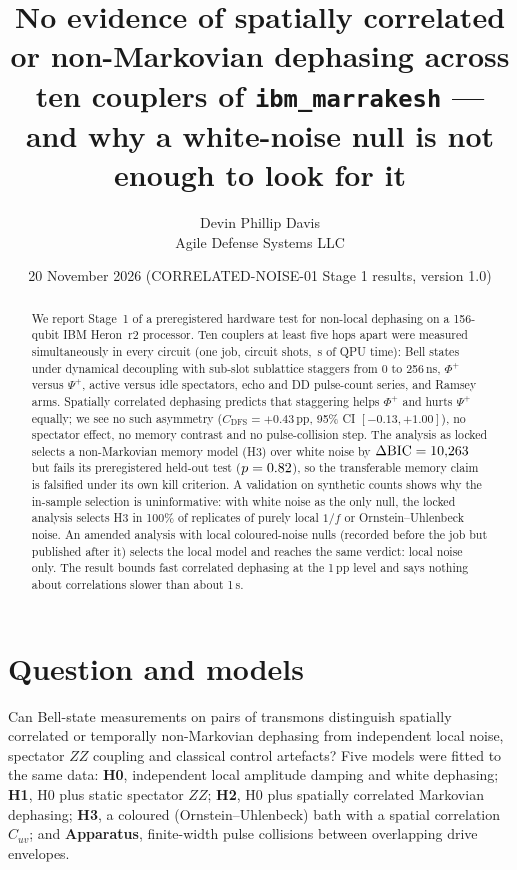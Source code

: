 \documentclass[10pt,twocolumn]{article}
\title{\bfseries No evidence of spatially correlated or non-Markovian dephasing across ten
couplers of \texttt{ibm\_marrakesh} --- and why a white-noise null is not enough to look for it}
\author{Devin Phillip Davis\\ \small Agile Defense Systems LLC}
\date{20 November 2026 \quad (CORRELATED-NOISE-01 Stage 1 results, version 1.0)}
\begin{document}
\maketitle

\begin{abstract}
\noindent
We report Stage~1 of a preregistered hardware test for non-local dephasing on a 156-qubit IBM
Heron~r2 processor. Ten couplers at least five hops apart were measured simultaneously in every
circuit (one job, \TotalShots{} circuit shots, \QpuSeconds{}\,s of QPU time): Bell states under
dynamical decoupling with sub-slot sublattice staggers from 0 to 256\,ns, $\Phi^+$ versus $\Psi^+$,
active versus idle spectators, echo and DD pulse-count series, and Ramsey arms. Spatially correlated
dephasing predicts that staggering helps $\Phi^+$ and hurts $\Psi^+$ equally; we see no such
asymmetry ($C_{\mathrm{DFS}}=+0.43$\,pp, 95\% CI $[-0.13,+1.00]$), no spectator effect, no
memory contrast and no pulse-collision step. The analysis as locked selects a non-Markovian
memory model (H3) over white noise by $\Delta\mathrm{BIC}=10{,}263$ but fails its preregistered
held-out test ($p=0.82$), so the transferable memory claim is falsified under its own kill
criterion. A validation on synthetic counts shows why the in-sample selection is uninformative: with
white noise as the only null, the locked analysis selects H3 in 100\% of replicates of purely local
$1/f$ or Ornstein--Uhlenbeck noise. An amended analysis with local coloured-noise nulls (recorded
before the job but published after it) selects the local model and reaches the same verdict: local
noise only. The result bounds fast correlated dephasing at the 1\,pp level and says nothing about
correlations slower than about 1\,\textmu s.
\end{abstract}

\section{Question and models}
Can Bell-state measurements on pairs of transmons distinguish spatially correlated or temporally
non-Markovian dephasing from independent local noise, spectator $ZZ$ coupling and classical control
artefacts? Five models were fitted to the same data:
\textbf{H0}, independent local amplitude damping and white dephasing;
\textbf{H1}, H0 plus static spectator $ZZ$;
\textbf{H2}, H0 plus spatially correlated Markovian dephasing;
\textbf{H3}, a coloured (Ornstein--Uhlenbeck) bath with a spatial correlation $C_{uv}$; and
\textbf{Apparatus}, finite-width pulse collisions between overlapping drive envelopes.
\end{document}
